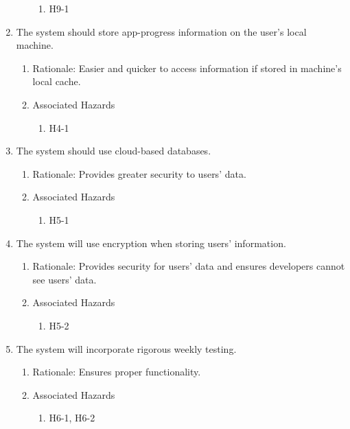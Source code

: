 \documentclass{article}
\begin{document}
\begin{enumerate}
\begin{enumerate}
		\begin{enumerate}
			\item H9-1
		\end{enumerate}
	\end{enumerate}
	\item The system should store app-progress information on the user’s local machine.
	\begin{enumerate}
		\item Rationale: Easier and quicker to access information if stored in machine’s local cache.
		\item Associated Hazards
		\begin{enumerate}
			\item H4-1
		\end{enumerate}
	\end{enumerate}
	\item The system should use cloud-based databases.
	\begin{enumerate}
		\item Rationale: Provides greater security to users’ data.
		\item Associated Hazards
		\begin{enumerate}
			\item H5-1
		\end{enumerate}
	\end{enumerate}
	\item The system will use encryption when storing users’ information.
	\begin{enumerate}
		\item Rationale: Provides security for users’ data and ensures developers cannot see users’ data.
		\item Associated Hazards
		\begin{enumerate}
			\item H5-2
		\end{enumerate}
	\end{enumerate} 
	\item The system will incorporate rigorous weekly testing.
	\begin{enumerate}
		\item Rationale: Ensures proper functionality.
		\item Associated Hazards
		\begin{enumerate}
			\item H6-1, H6-2
		\end{enumerate}
	\end{enumerate} 
\end{enumerate}
\end{document}

